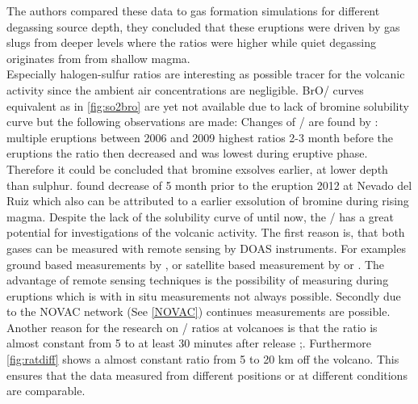 \documentclass  [
  paper    = a4,
  BCOR     = 10mm,
  twoside,
  fontsize = 12pt,
  fleqn,
  toc      = bibnumbered,
  toc      = listofnumbered,
  numbers  = noendperiod,
  headings = normal,
  listof   = leveldown,
  version  = 3.03
]                                       {scrreprt}
\begin{document}
	The authors compared these data to gas formation simulations for different degassing source depth, they concluded that these eruptions were driven by gas slugs from deeper levels where the ratios were higher while quiet degassing originates from from shallow magma.\\
	Especially halogen-sulfur ratios are interesting as possible tracer for the volcanic activity since the ambient air concentrations are negligible.
	BrO/  curves equivalent as in \cref{fig:so2bro} are yet not available due to lack of  bromine solubility curve but the following observations are made:
	Changes of /  are found by \citet{bobrowski2006bromine}: multiple eruptions between 2006 and 2009 highest ratios 2-3 month before the eruptions the ratio then decreased and was lowest during eruptive phase. Therefore it could be concluded that bromine exsolves earlier, at lower depth than sulphur.
	\citet{lubcke2014bro} found decrease of   5 month prior to the eruption 2012 at Nevado del Ruiz which also can be attributed to a earlier exsolution of bromine during rising magma.
	Despite the lack of the solubility curve of   until now, the /  has a great potential for investigations of the volcanic activity. The first reason is, that both gases can be measured with remote sensing by DOAS instruments. For examples ground based measurements by \citet{bobrowski2007reactive}, \citet{lubcke2014optical} or satellite based measurement by \citet{hormann2013systematic} or \citet{beirle2014estimating}. The advantage of remote sensing techniques is the possibility of measuring during eruptions which is with in situ measurements not always possible.
	Secondly due to the NOVAC network (See \cref{NOVAC}) continues measurements are possible.\\
	Another reason for the research on /  ratios at volcanoes is that the ratio is almost constant from 5 to at least 30 minutes after release \citep{bobrowski2007reactive};\citep{lubcke2014optical}. Furthermore \cref{fig:ratdiff} shows a almost constant ratio from 5 to 20 km off the volcano. This ensures that the data measured from different positions or at different conditions are comparable.\\
	\\
\end{document}

